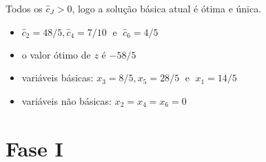 Todos os $ \widehat{c}_J > 0 $, logo a solução básica atual é ótima e única.

\begin{itemize}
  \item $ \widehat{c}_2 = 48/5, \widehat{c}_4 = 7/10 \;\text{ e }\; \widehat{c}_6 = 4/5 $
  \item o valor ótimo de $ z $ é $ -58/5 $
  \item variáveis básicas: $ x_3 = 8/5, x_5 = 28/5 \;\text{ e }\; x_1 = 14/5 $
  \item variáveis não básicas: $ x_2 = x_4 = x_6 = 0 $
\end{itemize}

\section{Fase I} %

